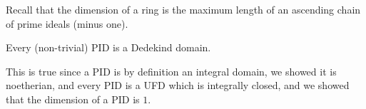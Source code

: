 \documentclass[10pt]{article}
\begin{document}
Recall that the dimension of a ring is the maximum length of an ascending chain of prime ideals (minus one).

\begin{prop*}

    Every (non-trivial) PID is a Dedekind domain.

\end{prop*}

This is true since a PID is by definition an integral domain, we showed it is noetherian, and every PID is a UFD which is integrally closed, and we showed that the dimension of a PID is $1$.
\end{document}
